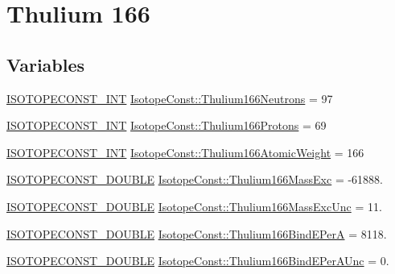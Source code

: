 \hypertarget{group___isotope_const-_thulium-_tm166}{}\section{Thulium 166}
\label{group___isotope_const-_thulium-_tm166}
\subsection*{Variables}
\begin{DoxyCompactItemize}
\item 
\mbox{\hyperlink{group___isotope_const-_macros_ga5f18360b3e99483a35c32d789e62621c}{I\+S\+O\+T\+O\+P\+E\+C\+O\+N\+S\+T\+\_\+\+I\+NT}} \mbox{\hyperlink{group___isotope_const-_thulium-_tm166_gae7c55906810945eed801516b4ce2332e}{Isotope\+Const\+::\+Thulium166\+Neutrons}} = 97
\item 
\mbox{\hyperlink{group___isotope_const-_macros_ga5f18360b3e99483a35c32d789e62621c}{I\+S\+O\+T\+O\+P\+E\+C\+O\+N\+S\+T\+\_\+\+I\+NT}} \mbox{\hyperlink{group___isotope_const-_thulium-_tm166_ga16c5d3af96f094296baa7b5760674f74}{Isotope\+Const\+::\+Thulium166\+Protons}} = 69
\item 
\mbox{\hyperlink{group___isotope_const-_macros_ga5f18360b3e99483a35c32d789e62621c}{I\+S\+O\+T\+O\+P\+E\+C\+O\+N\+S\+T\+\_\+\+I\+NT}} \mbox{\hyperlink{group___isotope_const-_thulium-_tm166_ga8e70ff683691488228662cb0ad3498f0}{Isotope\+Const\+::\+Thulium166\+Atomic\+Weight}} = 166
\item 
\mbox{\hyperlink{group___isotope_const-_macros_ga8f45a7272ce02c0b4c65c44636ed719a}{I\+S\+O\+T\+O\+P\+E\+C\+O\+N\+S\+T\+\_\+\+D\+O\+U\+B\+LE}} \mbox{\hyperlink{group___isotope_const-_thulium-_tm166_gaa8de8b67ad3c682b08cbede22ac79e60}{Isotope\+Const\+::\+Thulium166\+Mass\+Exc}} = -\/61888.
\item 
\mbox{\hyperlink{group___isotope_const-_macros_ga8f45a7272ce02c0b4c65c44636ed719a}{I\+S\+O\+T\+O\+P\+E\+C\+O\+N\+S\+T\+\_\+\+D\+O\+U\+B\+LE}} \mbox{\hyperlink{group___isotope_const-_thulium-_tm166_gad13c66a11cfeab5ed47d7b983533f22e}{Isotope\+Const\+::\+Thulium166\+Mass\+Exc\+Unc}} = 11.
\item 
\mbox{\hyperlink{group___isotope_const-_macros_ga8f45a7272ce02c0b4c65c44636ed719a}{I\+S\+O\+T\+O\+P\+E\+C\+O\+N\+S\+T\+\_\+\+D\+O\+U\+B\+LE}} \mbox{\hyperlink{group___isotope_const-_thulium-_tm166_ga2fe4f6351df7ebc59fd7a3fddb06e027}{Isotope\+Const\+::\+Thulium166\+Bind\+E\+PerA}} = 8118.
\item 
\mbox{\hyperlink{group___isotope_const-_macros_ga8f45a7272ce02c0b4c65c44636ed719a}{I\+S\+O\+T\+O\+P\+E\+C\+O\+N\+S\+T\+\_\+\+D\+O\+U\+B\+LE}} \mbox{\hyperlink{group___isotope_const-_thulium-_tm166_ga4752692ae509d2ded8661b53ae021a39}{Isotope\+Const\+::\+Thulium166\+Bind\+E\+Per\+A\+Unc}} = 0.

\end{DoxyCompactItemize}
